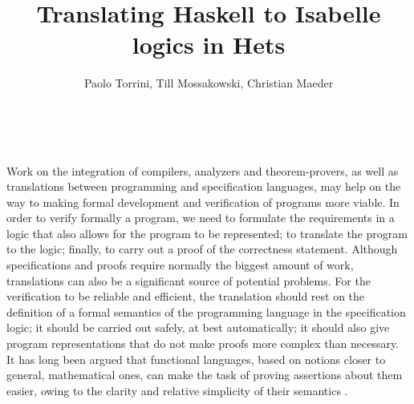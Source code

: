 \documentclass[a4paper,12pt]{article}
\begin{document}
\title{Translating Haskell to Isabelle logics in Hets}

\author{Paolo Torrini, Till Mossakowski, Christian Maeder} 


\date{}


\maketitle

\\

\sloppy

\noindent 
Work on the integration of compilers, analyzers and theorem-provers,
as well as translations between programming and specification
languages, may help on the way to making formal development and
verification of programs more viable. In order to verify formally a
program, we need to formulate the requirements in a logic that also
allows for the program to be represented; to translate the program to
the logic; finally, to carry out a proof of the correctness statement.
Although specifications and proofs require normally the biggest amount
of work, translations can also be a significant source of potential
problems. For the verification to be reliable and efficient, the
translation should rest on the definition of a formal semantics of the
programming language in the specification logic; it should be carried
out safely, at best automatically; it should also give program
representations that do not make proofs more complex than necessary.
It has long been argued that functional languages, based on notions
closer to general, mathematical ones, can make the task of proving
assertions about them easier, owing to the clarity and relative
simplicity of their semantics \cite{Thompson92}.
\end{document}
